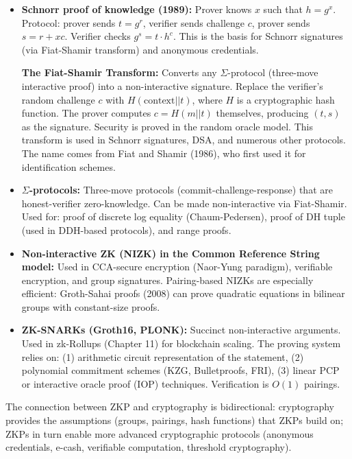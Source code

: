 \begin{itemize}
\item \textbf{Schnorr proof of knowledge (1989):} Prover knows $x$ such that $h = g^x$. Protocol: prover sends $t = g^r$, verifier sends challenge $c$, prover sends $s = r + xc$. Verifier checks $g^s = t \cdot h^c$. This is the basis for Schnorr signatures (via Fiat-Shamir transform) and anonymous credentials.

\textbf{The Fiat-Shamir Transform:} Converts any $\Sigma$-protocol (three-move interactive proof) into a non-interactive signature. Replace the verifier's random challenge $c$ with $H(\text{context} || t)$, where $H$ is a cryptographic hash function. The prover computes $c = H(m || t)$ themselves, producing $(t, s)$ as the signature. Security is proved in the random oracle model. This transform is used in Schnorr signatures, DSA, and numerous other protocols. The name comes from Fiat and Shamir (1986), who first used it for identification schemes.

\item \textbf{$\Sigma$-protocols:} Three-move protocols (commit-challenge-response) that are honest-verifier zero-knowledge. Can be made non-interactive via Fiat-Shamir. Used for: proof of discrete log equality (Chaum-Pedersen), proof of DH tuple (used in DDH-based protocols), and range proofs.

\item \textbf{Non-interactive ZK (NIZK) in the Common Reference String model:} Used in CCA-secure encryption (Naor-Yung paradigm), verifiable encryption, and group signatures. Pairing-based NIZKs are especially efficient: Groth-Sahai proofs (2008) can prove quadratic equations in bilinear groups with constant-size proofs.

\item \textbf{ZK-SNARKs (Groth16, PLONK):} Succinct non-interactive arguments. Used in zk-Rollups (Chapter 11) for blockchain scaling. The proving system relies on: (1) arithmetic circuit representation of the statement, (2) polynomial commitment schemes (KZG, Bulletproofs, FRI), (3) linear PCP or interactive oracle proof (IOP) techniques. Verification is $O(1)$ pairings.
\end{itemize}

The connection between ZKP and cryptography is bidirectional: cryptography provides the assumptions (groups, pairings, hash functions) that ZKPs build on; ZKPs in turn enable more advanced cryptographic protocols (anonymous credentials, e-cash, verifiable computation, threshold cryptography).

